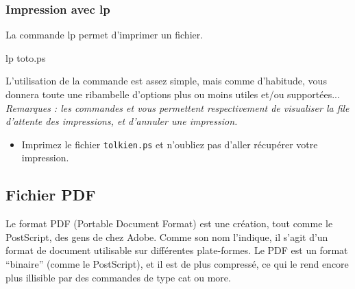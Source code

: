 \documentclass[a4paper,10pt]{article}
\begin{document}

\subsubsection{Impression avec lp}

La commande lp permet d'imprimer un fichier.

\begin{commandes}
lp toto.ps
\end{commandes}

L'utilisation de la commande est assez simple, mais comme d'habitude,  vous donnera toute une ri\-bambelle d'options plus ou moins utiles et/ou
supportées...\\

\emph{Remarques : les commandes  et  vous permettent
respectivement de visualiser la
file d'attente des impressions, et d'annuler une impression.
}


\begin{maw}
\begin{itemize}
  \item Imprimez le fichier \texttt{tolkien.ps} et n'oubliez pas d'aller
        récupérer votre impression.
\end{itemize}
\end{maw}

\subsection{Fichier PDF}

Le format PDF (Portable Document Format) est une création, tout comme le
PostScript, des gens de chez Adobe.
Comme son nom l'indique, il s'agit d'un format de document 
utilisable sur différentes plate-formes.
Le PDF est un format ``binaire'' (comme le PostScript), et il est de plus
compressé, ce qui le rend encore plus illisible par des commandes de type cat
ou more.
\end{document}
